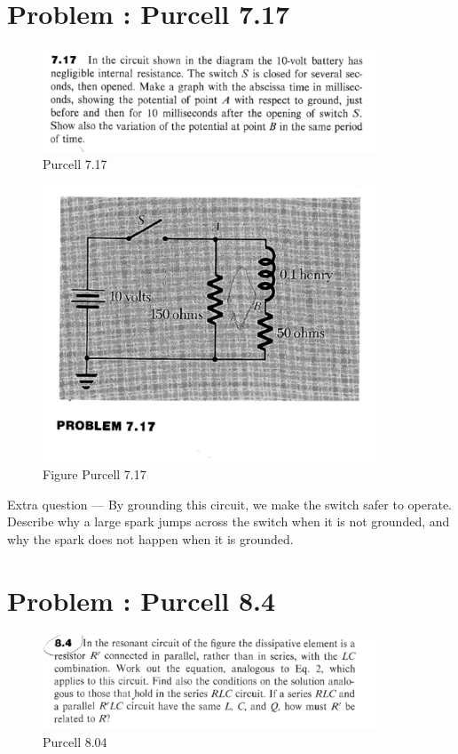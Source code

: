 \documentclass[problems]{esg8022pset}
\date{\today }
\begin{document}
\section{Problem \thesection: Purcell 7.17}
\begin{figure}[H]
    \centering
    \includegraphics[width = 10cm]{pu717}
    \caption{Purcell 7.17}
  \end{figure}

  \begin{figure}[H]
    \centering
    \includegraphics[width = 10cm]{figpu717}
    \caption{Figure Purcell 7.17}
  \end{figure}

 Extra question --- By grounding this circuit, we make the switch
safer to operate. Describe why a large spark jumps across the switch
when it is not grounded, and why the spark does not happen when it is
grounded.
\section{Problem \thesection: Purcell 8.4}
\begin{figure}[H]
    \centering
    \includegraphics[width = 10cm]{pu804}
    \caption{Purcell 8.04}
  \end{figure}
\end{document}

